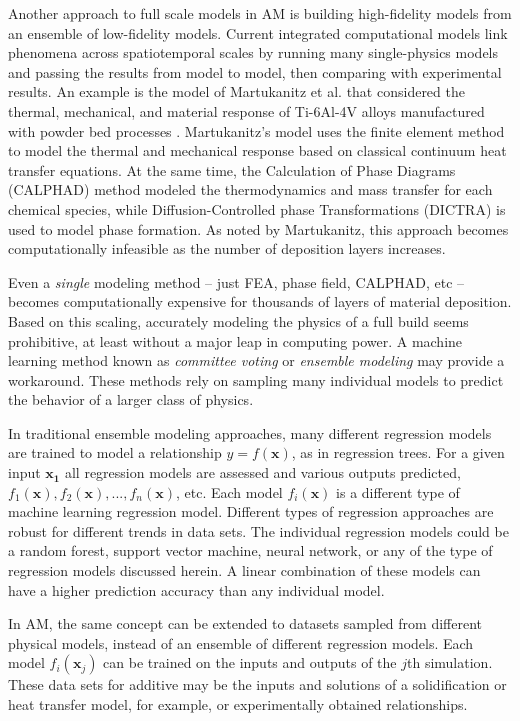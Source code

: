 Another approach to full scale models in AM is building high-fidelity models from an ensemble of low-fidelity models. Current integrated computational models link phenomena across spatiotemporal scales by running many single-physics models and passing the results from model to model, then comparing with experimental results. An example is the model of Martukanitz et al. that considered the thermal, mechanical, and material response of Ti-6Al-4V alloys manufactured with powder bed processes \cite{Martukanitz2014}. Martukanitz's model uses the finite element method to model the thermal and mechanical response based on classical continuum heat transfer equations. At the same time, the Calculation of Phase Diagrams (CALPHAD) method modeled the thermodynamics and mass transfer for each chemical species, while Diffusion-Controlled phase Transformations (DICTRA) is used to model phase formation. As noted by Martukanitz, this approach becomes computationally infeasible as the number of deposition layers increases.

Even a \textit{single} modeling method -- just FEA, phase field, CALPHAD, etc -- becomes computationally expensive for thousands of layers of material deposition. Based on this scaling, accurately modeling the physics of a full build seems prohibitive, at least without a major leap in computing power. A machine learning method known as \textit{committee voting} or \textit{ensemble modeling} may provide a workaround. These methods rely on sampling many individual models to predict the behavior of a larger class of physics.

In traditional ensemble modeling approaches, many different regression models are trained to model a relationship $y = f(\mathbf{x})$, as in regression trees. For a given input $\mathbf{x_1}$ all regression models are assessed and various outputs predicted, $f_1(\mathbf{x}), f_2(\mathbf{x}), ..., f_n(\mathbf{x})$, etc. Each model $f_i(\mathbf{x})$ is a different type of machine learning regression model. Different types of regression approaches are robust for different trends in data sets. The individual regression models could be a random forest, support vector machine, neural network, or any of the type of regression models discussed herein. A linear combination of these models can have a higher prediction accuracy than any individual model.

In AM, the same concept can be extended to datasets sampled from different physical models, instead of an ensemble of different regression models. Each model $f_i(\mathbf{x}_j)$ can be trained on the inputs and outputs of the $j$th simulation. These data sets for additive may be the inputs and solutions of a solidification or heat transfer model, for example, or experimentally obtained relationships.

